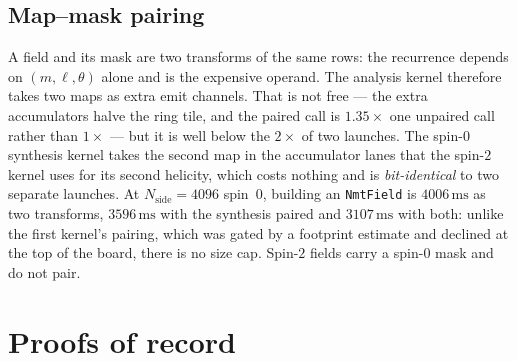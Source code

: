 \documentclass[usenatbib,useAMS]{mnras}
\begin{document}
\subsection{Map--mask pairing}
\label{sec:pair}

A field and its mask are two transforms of the same rows: the recurrence depends on $(m,\ell,\theta)$ alone and is the expensive operand. The analysis kernel therefore takes two maps as extra emit channels. That is not free --- the extra accumulators halve the ring tile, and the paired call is $1.35\times$ one unpaired call rather than $1\times$ --- but it is well below the $2\times$ of two launches. The spin-$0$ synthesis kernel takes the second map in the accumulator lanes that the spin-$2$ kernel uses for its second helicity, which costs nothing and is \emph{bit-identical} to two separate launches. At $N_{\mathrm{side}}=4096$ spin~$0$, building an \texttt{NmtField} is $4006\,\mathrm{ms}$ as two transforms, $3596\,\mathrm{ms}$ with the synthesis paired and $3107\,\mathrm{ms}$ with both: unlike the first kernel's pairing, which was gated by a footprint estimate and declined at the top of the board, there is no size cap. Spin-$2$ fields carry a spin-$0$ mask and do not pair.

\section{Proofs of record}
\label{sec:formal}
\end{document}
